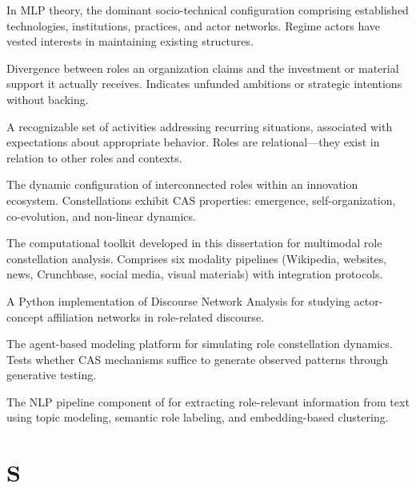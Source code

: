 \documentclass[../main.tex]{subfiles}
\begin{document}
\begin{description}[leftmargin=0.5cm, style=nextline]

\item[Regime] In MLP theory, the dominant socio-technical configuration comprising established technologies, institutions, practices, and actor networks. Regime actors have vested interests in maintaining existing structures.

\item[Resource Gap] Divergence between roles an organization claims and the investment or material support it actually receives. Indicates unfunded ambitions or strategic intentions without backing.

\item[Role] A recognizable set of activities addressing recurring situations, associated with expectations about appropriate behavior. Roles are relational---they exist in relation to other roles and contexts.

\item[Role Constellation] The dynamic configuration of interconnected roles within an innovation ecosystem. Constellations exhibit CAS properties: emergence, self-organization, co-evolution, and non-linear dynamics.

\item[\RoleBox] The computational toolkit developed in this dissertation for multimodal role constellation analysis. Comprises six modality pipelines (Wikipedia, websites, news, Crunchbase, social media, visual materials) with integration protocols.

\item[RoleDNA] A Python implementation of Discourse Network Analysis for studying actor-concept affiliation networks in role-related discourse.

\item[\RoleSim] The agent-based modeling platform for simulating role constellation dynamics. Tests whether CAS mechanisms suffice to generate observed patterns through generative testing.

\item[RoleXray] The NLP pipeline component of \RoleBox{} for extracting role-relevant information from text using topic modeling, semantic role labeling, and embedding-based clustering.

\end{description}

\section*{S}
\end{document}
